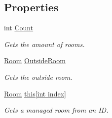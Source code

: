 \subsection*{Properties}
\begin{DoxyCompactItemize}
\item 
int \hyperlink{class_project_porcupine_1_1_rooms_1_1_room_manager_aff155953e003b35071ce20d4cfc7aaf7}{Count}
\begin{DoxyCompactList}\small\item\em Gets the amount of rooms. \end{DoxyCompactList}\item 
\hyperlink{class_project_porcupine_1_1_rooms_1_1_room}{Room} \hyperlink{class_project_porcupine_1_1_rooms_1_1_room_manager_adc67244d6abd3955beb780d4add7bbac}{Outside\+Room}
\begin{DoxyCompactList}\small\item\em Gets the outside room. \end{DoxyCompactList}\item 
\hyperlink{class_project_porcupine_1_1_rooms_1_1_room}{Room} \hyperlink{class_project_porcupine_1_1_rooms_1_1_room_manager_a6763abd4726b4dd98bb2fcb89484b31e}{this\mbox{[}int index\mbox{]}}
\begin{DoxyCompactList}\small\item\em Gets a managed room from an ID. \end{DoxyCompactList}\end{DoxyCompactItemize}
